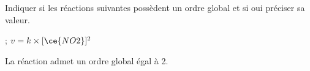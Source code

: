 
\finEntrainement








\hauteurLargeurCadreReponse		{8mm}{7cm}
\initialisationEntrainement

Indiquer si les réactions suivantes possèdent un ordre global et si oui préciser sa valeur.

\debutEntrainement




\begin{enonce}
 ; $v = k \times [\ce{NO2}]^2$
\end{enonce}


\begin{corrige}
La réaction admet un ordre global égal à 2. 
\end{corrige}



